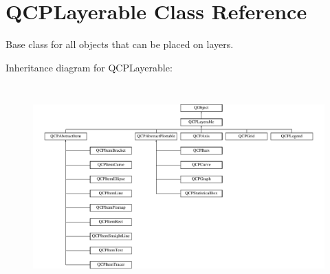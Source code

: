 \hypertarget{classQCPLayerable}{\section{Q\-C\-P\-Layerable Class Reference}
\label{classQCPLayerable}
}


Base class for all objects that can be placed on layers.  


Inheritance diagram for Q\-C\-P\-Layerable\-:\begin{figure}[H]
\begin{center}
\leavevmode
\includegraphics[height=7.887324cm]{classQCPLayerable}
\end{center}
\end{figure}
